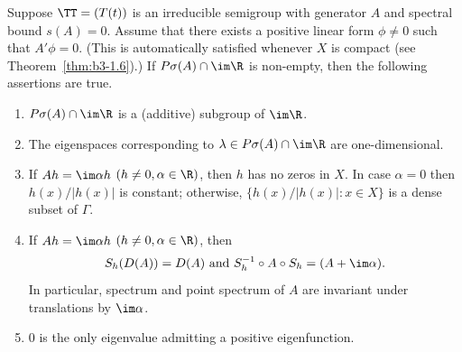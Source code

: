 \begin{theorem}\label{thm:b3-3.6}
%
	Suppose $\TT = (T(t))$ is an irreducible semigroup with generator $A$ and spectral bound $s(A) = 0$.
	Assume that there exists a positive linear form $\phi \neq 0$ such that $A'\phi = 0$. 
    (This is automatically satisfied whenever $X$ is compact (see Theorem~\ref{thm:b3-1.6}).)
	If\/ $P\sigma(A)\cap \im\R$ is non-empty, then the following assertions are true.
	\begin{enumerate}[\upshape (i)]
		\item 
		$P\sigma(A)\cap \im\R$ is a (additive) subgroup of\/ $\im \R$.
	
		\item 
		The eigenspaces corresponding to $\lambda \in P\sigma(A)\cap \im\R$ are one-dimensional.
	
		\item 
		If\/ $Ah = \im\alpha h$ $(h \neq 0, \alpha \in \R)$, then $h$ has no zeros in $X$.
		In case $\alpha = 0$ then $h(x)/|h(x)|$ is constant; otherwise, $\{h(x)/|h(x)| \colon x \in X\}$ is a dense subset of\/ $\Gamma$.
	
		\item 
		If\/ $Ah = \im\alpha h$ $(h \neq 0, \alpha \in \R)$, then
		\begin{equation}\label{eq:b3-3.5}
			S_{h}(D(A)) = D(A) \text{ and } S_{h}^{-1}\circ A \circ S_{h} = (A + \im\alpha).
		\end{equation}
		In particular, spectrum and point spectrum of\/ $A$ are invariant under translations by $\im \alpha$.
	
		\item 
		$0$ is the only eigenvalue admitting a positive eigenfunction.
	\end{enumerate}
\end{theorem}
